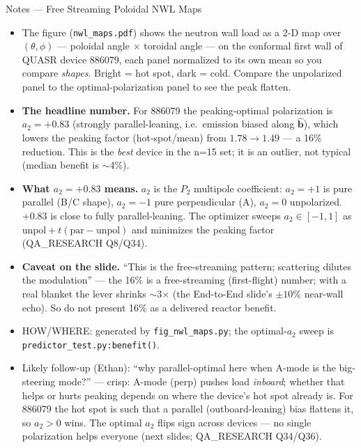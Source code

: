 \documentclass[11pt,aspectratio=169]{beamer}
\newcommand{\bhat}{\hat{\mathbf{b}}}
\begin{document}
\begin{frame}[allowframebreaks]{Notes --- Free Streaming Poloidal NWL Maps}
{\color{red}\footnotesize
\begin{itemize}
\item The figure (\texttt{nwl\_maps.pdf}) shows the neutron wall load as a 2-D map over
      $(\theta,\phi)$ --- poloidal angle $\times$ toroidal angle --- on the conformal first wall of
      QUASR device 886079, each panel normalized to its own mean so you compare \emph{shapes}. Bright
      = hot spot, dark = cold. Compare the unpolarized panel to the optimal-polarization panel to see
      the peak flatten.
\item \textbf{The headline number.} For 886079 the peaking-optimal polarization is $a_2=+0.83$
      (strongly parallel-leaning, i.e.\ emission biased along $\bhat$), which lowers the peaking
      factor (hot-spot/mean) from $1.78\to1.49$ --- a 16\% reduction. This is the \emph{best} device in
      the n=15 set; it is an outlier, not typical (median benefit is $\sim$4\%).
\item \textbf{What $a_2=+0.83$ means.} $a_2$ is the $P_2$ multipole coefficient: $a_2=+1$ is pure
      parallel (B/C shape), $a_2=-1$ pure perpendicular (A), $a_2=0$ unpolarized. $+0.83$ is close to
      fully parallel-leaning. The optimizer sweeps $a_2\in[-1,1]$ as $\text{unpol}+t(\text{par}-
      \text{unpol})$ and minimizes the peaking factor (QA\_RESEARCH Q8/Q34).
\item \textbf{Caveat on the slide.} ``This is the free-streaming pattern; scattering dilutes the
      modulation'' --- the 16\% is a free-streaming (first-flight) number; with a real blanket the
      lever shrinks $\sim$3$\times$ (the End-to-End slide's $\pm10\%$ near-wall echo). So do not
      present 16\% as a delivered reactor benefit.
\item HOW/WHERE: generated by \texttt{fig\_nwl\_maps.py}; the optimal-$a_2$ sweep is
      \texttt{predictor\_test.py:benefit()}.
\item Likely follow-up (Ethan): ``why parallel-optimal here when A-mode is the big-steering mode?'' ---
      crisp: A-mode (perp) pushes load \emph{inboard}; whether that helps or hurts peaking depends on
      where the device's hot spot already is. For 886079 the hot spot is such that a parallel
      (outboard-leaning) bias flattens it, so $a_2>0$ wins. The optimal $a_2$ flips sign across devices
      --- no single polarization helps everyone (next slides; QA\_RESEARCH Q34/Q36).
\end{itemize}
}
\end{frame}
\end{document}
